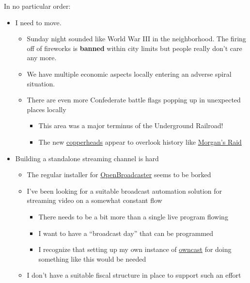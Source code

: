 In no particular order:

\begin{itemize}
\tightlist
\item
  I need to move.

  \begin{itemize}
  \tightlist
  \item
    Sunday night sounded like World War III in the neighborhood. The
    firing off of fireworks is \textbf{banned} within city limits but
    people really don't care any more.
  \item
    We have multiple economic aspects locally entering an adverse spiral
    situation.
  \item
    There are even more Confederate battle flags popping up in
    unexpected places locally

    \begin{itemize}
    \tightlist
    \item
      This area was a major terminus of the Underground Railroad!
    \item
      The new
      \href{https://ohiohistorycentral.org/w/Copperheads}{copperheads}
      appear to overlook history like
      \href{https://ohiohistorycentral.org/w/Morgan\%27s_Raid}{Morgan's
      Raid}
    \end{itemize}
  \end{itemize}
\item
  Building a standalone streaming channel is hard

  \begin{itemize}
  \tightlist
  \item
    The regular installer for
    \href{https://openbroadcaster.com/}{OpenBroadcaster} seems to be
    borked
  \item
    I've been looking for a suitable broadcast automation solution for
    streaming video on a somewhat constant flow

    \begin{itemize}
    \tightlist
    \item
      There needs to be a bit more than a single live program flowing
    \item
      I want to have a ``broadcast day'' that can be programmed
    \item
      I recognize that setting up my own instance of
      \href{https://owncast.online/}{owncast} for doing something like
      this would be needed
    \end{itemize}
  \item
    I don't have a suitable fiscal structure in place to support such an
    effort


\end{itemize}
\end{itemize}
